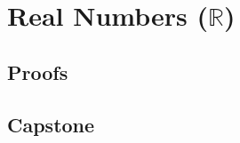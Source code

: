 \chapter{\texorpdfstring{Real Numbers ($\mathbb{R}$)}{Real Numbers (R)}}
\label{ch:reals}




\LRAExcludeFromPrintEditionBegin
\section*{Proofs}


\section*{Capstone}

\LRAExcludeFromPrintEditionEnd
